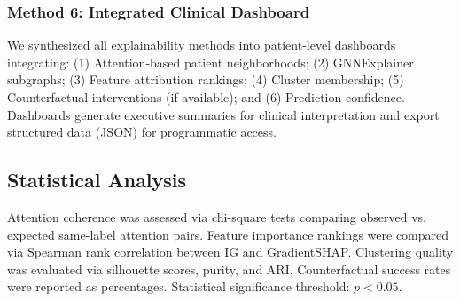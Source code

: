 \subsubsection{Method 6: Integrated Clinical Dashboard}

We synthesized all explainability methods into patient-level dashboards integrating: (1) Attention-based patient neighborhoods; (2) GNNExplainer subgraphs; (3) Feature attribution rankings; (4) Cluster membership; (5) Counterfactual interventions (if available); and (6) Prediction confidence. Dashboards generate executive summaries for clinical interpretation and export structured data (JSON) for programmatic access.

\subsection{Statistical Analysis}

Attention coherence was assessed via chi-square tests comparing observed vs. expected same-label attention pairs. Feature importance rankings were compared via Spearman rank correlation between IG and GradientSHAP. Clustering quality was evaluated via silhouette scores, purity, and ARI. Counterfactual success rates were reported as percentages. Statistical significance threshold: $p < 0.05$.
